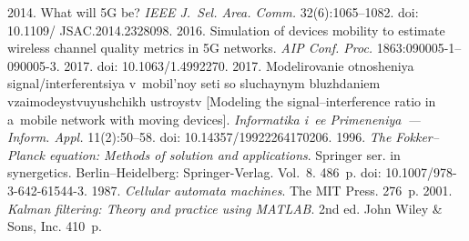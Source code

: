   \begin{multicols}{2}

\renewcommand{\bibname}{\protect\rmfamily References}

{\small\frenchspacing
 {%
 \begin{thebibliography}{99}
 2014. What will 5G be? \textit{IEEE J.~Sel. Area. Comm.} 
 32(6):1065--1082. doi: 10.1109/ JSAC.2014.2328098.
 2016. Simulation of devices mobility to estimate wireless channel 
quality metrics in 5G networks. \textit{AIP Conf. Proc.}  
1863:090005-1--090005-3. 2017. doi: 
10.1063/1.4992270.
2017. Modelirovanie otnosheniya signal/\linebreak interferentsiya v~mobil'noy seti so sluchaynym 
bluzhdaniem vzaimodeystvuyushchikh ustroystv [Modeling the signal--interference ratio in 
a~mobile network with moving devices]. \textit{Informatika i~ee Primeneniya~--- Inform. 
Appl.} 11(2):50--58. doi: 10.14357/19922264170206.
 1996. 
\textit{The Fokker--Planck equation: Methods of solution 
and applications}. Springer ser. in synergetics.  Berlin--Heidelberg: 
Springer-Verlag.  Vol.~8.
 486~p. doi: 10.1007/978-3-642-61544-3.
 1987. \textit{Cellular automata machines}. 
The MIT Press. 276~p.
 2001. \textit{Kalman filtering: 
Theory and practice using MATLAB}. 2nd ed.  John Wiley \& Sons, Inc. 410~p.


\end{thebibliography}}}
\end{multicols}

